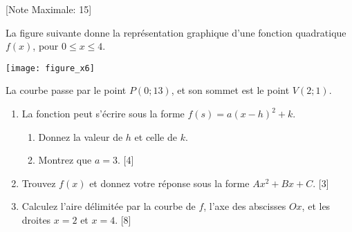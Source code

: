 \begin{question}
  \hspace*{\fill} [Note Maximale: 15]\par
  \medskip
  \begin{center} %
    \noindent La figure suivante donne la représentation graphique d'une fonction quadratique $f(x)$, pour $0 \le x \le 4$.\par
    \texttt{[image: figure\_x6]}\par
    \noindent La courbe passe par le point $P(0; 13)$, et son sommet est le point $V(2; 1)$.\par
  \end{center} %
  \begin{enumerate}[label=(\alph*)]
    \item La fonction peut s'écrire sous la forme $f(s) = a(x-h)^2 + k$.
      \begin{enumerate}[label=(\roman*)]
        \item Donnez la valeur de $h$ et celle de $k$.
        \item Montrez que $a=3$.\hspace*{\fill} [4]
      \end{enumerate}
    \item Trouvez $f(x)$ et donnez votre réponse sous la forme $Ax^2 + Bx + C$.\hspace*{\fill} [3]
    \item Calculez l'aire délimitée par la courbe de $f$, l’axe des abscisses $Ox$, et les droites $x=2$ et $x=4$.\hspace*{\fill} [8]
  \end{enumerate}
\end{question}
